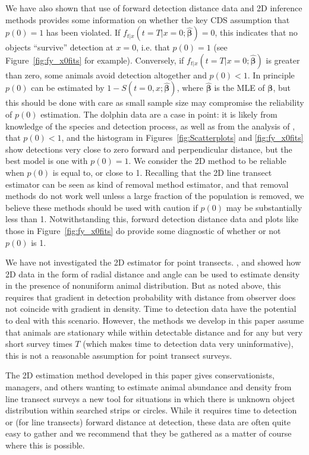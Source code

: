 \documentclass[useAMS,usenatbib,referee]{biom}
\begin{document}
We have also shown that use of forward detection distance data and 2D inference methods provides some information on whether the key CDS assumption that $p(0)=1$ has been violated. If $f_{t|x}(t=T|x=0;\hat{\boldsymbol{\beta}})=0$, this indicates that no objects ``survive'' detection at $x=0$, i.e. that $p(0)=1$ (see Figure~\ref{fig:fy_x0fits} for example). Conversely, if $f_{t|x}(t=T|x=0;\hat{\boldsymbol{\beta}})$ is greater than zero, some animals avoid detection altogether and $p(0)<1$. In principle $p(0)$ can be estimated by $1-S(t=0,x;\hat{\boldsymbol{\beta}})$, where $\hat{\boldsymbol{\beta}}$ is the MLE of $\boldsymbol{\beta}$, but this should be done with care as small sample size may compromise the reliability of $p(0)$ estimation. The dolphin data are a case in point: it is likely from knowledge of the species and detection process, as well as from the analysis of \cite{Canadas+al:04}, that $p(0)<1$, and the histogram in Figures~\ref{fig:Scatterplots} and \ref{fig:fy_x0fits} show detections very close to zero forward and perpendicular distance, but the best model is one with $p(0)=1$. We consider the 2D method to be reliable when $p(0)$ is equal to, or close to 1. Recalling that the 2D line transect estimator can be seen as kind of removal method estimator, and that removal methods do not work well unless a large fraction of the population is removed, we believe these methods should be used with caution if $p(0)$ may be substantially less than 1. Notwithstanding this, forward detection distance data and plots like those in Figure~\ref{fig:fy_x0fits} do provide some diagnostic of whether or not $p(0)$ is 1.

We have not investigated the 2D estimator for point transects. \cite{Marques+al:10a}, \cite{Cox+al:11} and \cite{Arranz+al:14} showed how 2D data in the form of radial distance and angle can be used to estimate density in the presence of nonuniform animal distribution. But as noted above, this requires that gradient in detection probability with distance from observer does not coincide with gradient in density. Time to detection data have the potential to deal with this scenario. However, the methods we develop in this paper assume that animals are stationary while within detectable distance and for any but very short survey times $T$ (which makes time to detection data very uninformative), this is not a reasonable assumption for point transect surveys.

The 2D estimation method developed in this paper gives conservationists, managers, and others wanting to estimate animal abundance and density from line transect surveys a new tool for situations in which there is unknown object distribution within searched strips or circles. While it requires time to detection or (for line transects) forward distance at detection, these data are often quite easy to gather and we recommend that they be gathered as a matter of course where this is possible. 
\end{document}
